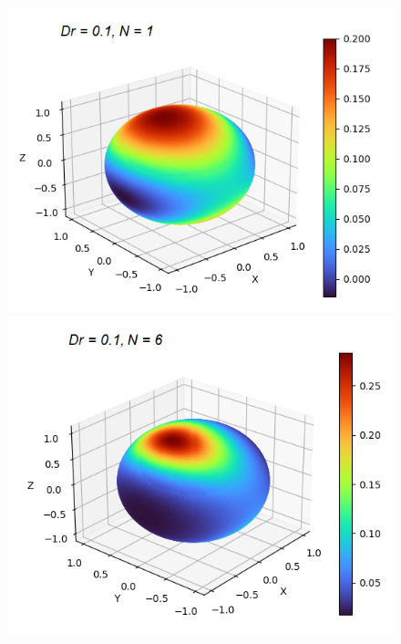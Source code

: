 \begin{frame}
	\scriptsize
	\begin{figure}[H]
		\centering
		\begin{minipage}{0.4\textwidth}
			\includegraphics[scale=0.4]{Bilder_wx/wx=1_Dr=0.1_N=1}
		\end{minipage}
		\hfill 
		\begin{minipage}{0.4\textwidth}
			\includegraphics[scale=0.4]{Bilder_wx/wx=1_Dr=0.1_N=6}
		\end{minipage}
		\hfill 
		\begin{minipage}{0.4\textwidth}

\end{minipage}
\end{figure}
\end{frame}
